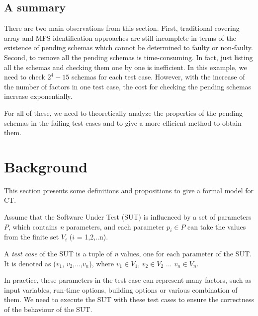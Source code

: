 \subsection{A summary}

There are two main observations from this section. First, traditional covering array and MFS identification approaches are still incomplete in terms of the existence of pending schemas which cannot be determined to faulty or non-faulty. Second, to remove all the pending schemas is time-consuming. In fact, just listing all the schemas and checking them one by one is inefficient. In this example, we need to check $2^{4} - 15$ schemas for each test case. However, with the increase of the number of factors in one test case, the cost for checking the pending schemas increase exponentially.

For all of these, we need to theoretically analyze the properties of the pending schemas in the failing test cases and to give a more efficient method to obtain them.

\section{Background}\label{sec:back}
This section presents some definitions and propositions to give a formal model for CT.

Assume that the Software Under Test (SUT) is influenced by a set of parameters $P$, which contains \emph{n} parameters, and each parameter $p_{i} \in P$ can take the values from the finite set $V_{i}$ ($i$ = 1,2,..n).

\newtheorem{assumption}{Assumption}

\begin{definition}\label{de:testcase}
A \emph{test case} of the SUT is a tuple of \emph{n} values, one for each parameter of the SUT. It is denoted as  ($v_{1}$, $v_{2}$,...,$v_{n}$), where $v_{1}\in V_{1}$, $v_{2} \in V_{2}$ ... $v_{n} \in V_{n}$.
\end{definition}

In practice, these parameters in the test case can represent many factors, such as input variables, run-time options, building options or various combination of them. We need to execute the SUT with these test cases to ensure the correctness of the behaviour of the SUT.

